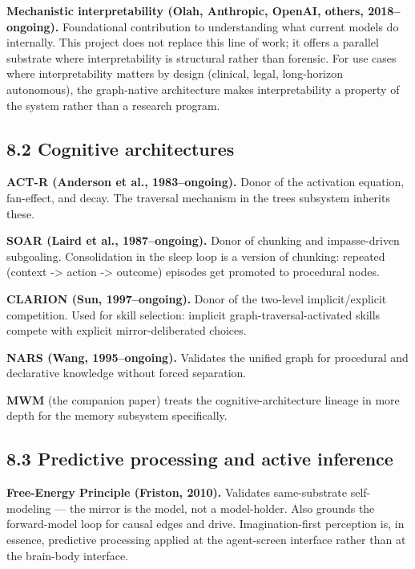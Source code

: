\documentclass[12pt]{article}
\begin{document}
\textbf{Mechanistic interpretability (Olah, Anthropic, OpenAI, others, 2018--ongoing).} Foundational contribution to understanding what current models do internally. This project does not replace this line of work; it offers a parallel substrate where interpretability is structural rather than forensic. For use cases where interpretability matters by design (clinical, legal, long-horizon autonomous), the graph-native architecture makes interpretability a property of the system rather than a research program.

\subsection{8.2 Cognitive architectures}\label{cognitive-architectures}

\textbf{ACT-R (Anderson et al., 1983--ongoing).} Donor of the activation equation, fan-effect, and decay. The traversal mechanism in the trees subsystem inherits these.

\textbf{SOAR (Laird et al., 1987--ongoing).} Donor of chunking and impasse-driven subgoaling. Consolidation in the sleep loop is a version of chunking: repeated (context -\textgreater{} action -\textgreater{} outcome) episodes get promoted to procedural nodes.

\textbf{CLARION (Sun, 1997--ongoing).} Donor of the two-level implicit/explicit competition. Used for skill selection: implicit graph-traversal-activated skills compete with explicit mirror-deliberated choices.

\textbf{NARS (Wang, 1995--ongoing).} Validates the unified graph for procedural and declarative knowledge without forced separation.

\textbf{MWM} (the companion paper) treats the cognitive-architecture lineage in more depth for the memory subsystem specifically.

\subsection{8.3 Predictive processing and active inference}\label{predictive-processing-and-active-inference}

\textbf{Free-Energy Principle (Friston, 2010).} Validates same-substrate self-modeling --- the mirror is the model, not a model-holder. Also grounds the forward-model loop for causal edges and drive. Imagination-first perception is, in essence, predictive processing applied at the agent-screen interface rather than at the brain-body interface.
\end{document}
